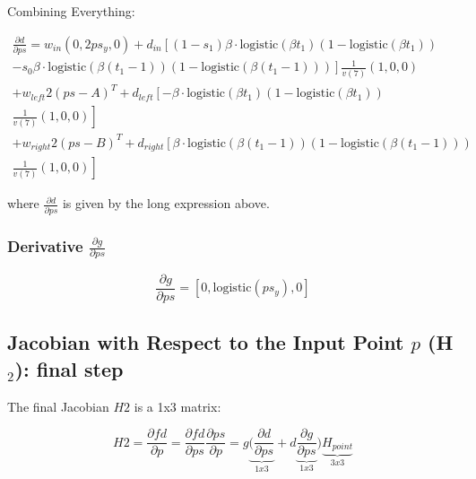 \documentclass[11pt]{article}
\begin{document}
                Combining Everything:

                \begin{multline}
                    \frac{\partial d}{\partial ps} = w_{in}(0, 2ps_y, 0) + d_{in}\left[(1 - s_1)\beta \cdot \text{logistic}(\beta t_1)(1 - \text{logistic}(\beta t_1)) \right. \\
                    \left. - s_0\beta \cdot \text{logistic}(\beta (t_1 - 1))(1 - \text{logistic}(\beta (t_1 - 1)))\right] \frac{1}{v(7)} (1, 0, 0) \\
                    + w_{left}2(ps - A)^T + d_{left}\left[-\beta \cdot \text{logistic}(\beta t_1)(1 - \text{logistic}(\beta t_1)) \right. \\
                    \left. \frac{1}{v(7)} (1, 0, 0)\right] \\
                    + w_{right}2(ps - B)^T + d_{right}\left[\beta \cdot \text{logistic}(\beta (t_1 - 1))(1 - \text{logistic}(\beta (t_1 - 1))) \right. \\
                    \left. \frac{1}{v(7)} (1, 0, 0)\right]
                \end{multline}

%

                where $\frac{\partial d}{\partial ps}$ is given by the long expression above.

            \subsubsection*{Derivative $\frac{\partial g}{\partial ps}$}

                \begin{equation}
                    \frac{\partial g}{\partial ps} = [0, \text{logistic}(ps_y), 0]
                \end{equation}

        \subsection*{Jacobian with Respect to the Input Point \(p\) (H\(_2\)): final step}
        The final Jacobian $H2$ is a 1x3 matrix:

        \begin{equation}
            H2 = \frac{\partial fd}{\partial p} =
                 \frac{\partial fd}{\partial ps}\frac{\partial ps}{\partial p} =
                 g \underbrace{(\frac{\partial d}{\partial ps}}_{1x3} + d \underbrace{\frac{\partial g}{\partial ps}}_{1x3}) \underbrace{H_{point}}_{3x3}
        \end{equation}
\end{document}
